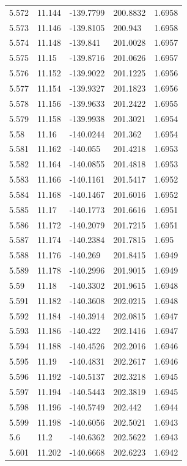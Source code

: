 \begin{tabular}{lllll}
5.572 & 11.144 & -139.7799 & 200.8832 & 1.6958 \\
5.573 & 11.146 & -139.8105 & 200.943 & 1.6958 \\
5.574 & 11.148 & -139.841 & 201.0028 & 1.6957 \\
5.575 & 11.15 & -139.8716 & 201.0626 & 1.6957 \\
5.576 & 11.152 & -139.9022 & 201.1225 & 1.6956 \\
5.577 & 11.154 & -139.9327 & 201.1823 & 1.6956 \\
5.578 & 11.156 & -139.9633 & 201.2422 & 1.6955 \\
5.579 & 11.158 & -139.9938 & 201.3021 & 1.6954 \\
5.58 & 11.16 & -140.0244 & 201.362 & 1.6954 \\
5.581 & 11.162 & -140.055 & 201.4218 & 1.6953 \\
5.582 & 11.164 & -140.0855 & 201.4818 & 1.6953 \\
5.583 & 11.166 & -140.1161 & 201.5417 & 1.6952 \\
5.584 & 11.168 & -140.1467 & 201.6016 & 1.6952 \\
5.585 & 11.17 & -140.1773 & 201.6616 & 1.6951 \\
5.586 & 11.172 & -140.2079 & 201.7215 & 1.6951 \\
5.587 & 11.174 & -140.2384 & 201.7815 & 1.695 \\
5.588 & 11.176 & -140.269 & 201.8415 & 1.6949 \\
5.589 & 11.178 & -140.2996 & 201.9015 & 1.6949 \\
5.59 & 11.18 & -140.3302 & 201.9615 & 1.6948 \\
5.591 & 11.182 & -140.3608 & 202.0215 & 1.6948 \\
5.592 & 11.184 & -140.3914 & 202.0815 & 1.6947 \\
5.593 & 11.186 & -140.422 & 202.1416 & 1.6947 \\
5.594 & 11.188 & -140.4526 & 202.2016 & 1.6946 \\
5.595 & 11.19 & -140.4831 & 202.2617 & 1.6946 \\
5.596 & 11.192 & -140.5137 & 202.3218 & 1.6945 \\
5.597 & 11.194 & -140.5443 & 202.3819 & 1.6945 \\
5.598 & 11.196 & -140.5749 & 202.442 & 1.6944 \\
5.599 & 11.198 & -140.6056 & 202.5021 & 1.6943 \\
5.6 & 11.2 & -140.6362 & 202.5622 & 1.6943 \\
5.601 & 11.202 & -140.6668 & 202.6223 & 1.6942 \\

\end{tabular}
